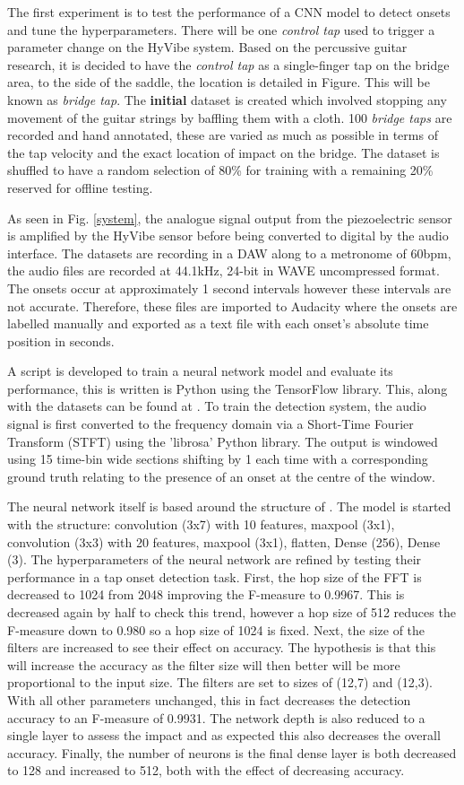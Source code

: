 \documentclass[conference]{IEEEtran}
\begin{document}
The first experiment is to test the performance of a CNN model to detect onsets and tune the hyperparameters. There will be one \emph{control tap} used to trigger a parameter change on the HyVibe system. Based on the percussive guitar research, it is decided to have the \emph{control tap} as a single-finger tap on the bridge area, to the side of
the saddle, the location is detailed in Figure. This will be known as \emph{bridge tap}. The \textbf{initial} dataset is created which involved stopping any movement of the guitar strings by baffling them with a cloth. 100 \emph{bridge taps} are recorded and hand annotated, these are varied as much as possible
in terms of the tap velocity and the exact location of impact on the bridge. The dataset is shuffled to have a random selection of 80\% for training with a remaining 20\% reserved for offline testing. 

As seen in Fig. \ref{system}, the analogue signal output from the piezoelectric sensor is amplified by the HyVibe sensor before being converted to digital by the audio interface. The datasets are recording in a DAW along to
a metronome of 60bpm, the audio files are recorded at 44.1kHz, 24-bit in WAVE uncompressed format. The onsets occur at approximately 1 second intervals however these intervals are not accurate. Therefore, these files are imported 
to Audacity where the onsets are labelled manually and exported as a text file with each onset's absolute time position in seconds.

A script is developed to train a neural network model and evaluate its performance, this is written is Python using the TensorFlow library. This, along with the datasets can be found at . To train the detection system, the audio signal is first converted to the frequency domain via a Short-Time Fourier Transform (STFT) using the 'librosa' Python library. The output is windowed
using 15 time-bin wide sections shifting by 1 each time with a corresponding ground truth relating to the presence of an onset at the centre of the window.

The neural network itself is based around the structure of . The model is started with the structure: convolution (3x7) with 10 features, maxpool (3x1), convolution (3x3) with 20 features, maxpool (3x1), flatten, Dense (256), Dense (3).
The hyperparameters of the neural network are refined by testing their performance in a tap onset detection task. First, the hop size of the FFT is decreased to 1024 from 2048 improving the F-measure to 0.9967. This is decreased again by half to check this trend,
however a hop size of 512 reduces the F-measure down to 0.980 so a hop size of 1024 is fixed. Next, the size of the filters are increased to see their effect on accuracy. The hypothesis is that this will increase the accuracy as the filter size will then better
will be more proportional to the input size. The filters are set to sizes of (12,7) and (12,3). With all other parameters unchanged, this in fact decreases the detection accuracy to an F-measure of 0.9931. The network depth is also reduced to a single layer to assess the impact
and as expected this also decreases the overall accuracy. Finally, the number of neurons is the final dense layer is both decreased to 128 and increased to 512, both with the effect of decreasing accuracy.
\end{document}
